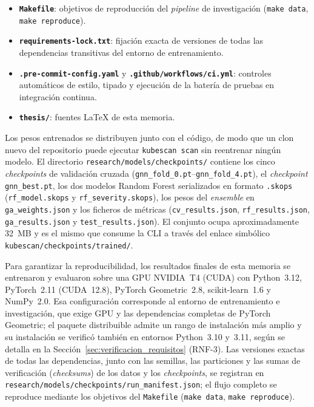 \begin{itemize}
  \item \textbf{\texttt{Makefile}}: objetivos de reproducción del \textit{pipeline}
    de investigación (\texttt{make data}, \texttt{make reproduce}).
  \item \textbf{\texttt{requirements-lock.txt}}: fijación exacta de versiones de
    todas las dependencias transitivas del entorno de entrenamiento.
  \item \textbf{\texttt{.pre-commit-config.yaml}} y
    \textbf{\texttt{.github/workflows/ci.yml}}: controles automáticos de estilo,
    tipado y ejecución de la batería de pruebas en integración continua.
  \item \textbf{\texttt{thesis/}}: fuentes LaTeX de esta memoria.
\end{itemize}

Los pesos entrenados se distribuyen junto con el código, de modo que un clon
nuevo del repositorio puede ejecutar \texttt{kubescan scan} sin reentrenar
ningún modelo. El directorio \texttt{research/models/checkpoints/} contiene los
cinco \textit{checkpoints} de validación cruzada
(\texttt{gnn\_fold\_0.pt}--\texttt{gnn\_fold\_4.pt}), el \textit{checkpoint}
\texttt{gnn\_best.pt}, los dos modelos Random Forest serializados en formato
\texttt{.skops} (\texttt{rf\_model.skops} y \texttt{rf\_severity.skops}), los
pesos del \textit{ensemble} en \texttt{ga\_weights.json} y los ficheros de
métricas (\texttt{cv\_results.json}, \texttt{rf\_results.json},
\texttt{ga\_results.json} y \texttt{test\_results.json}). El conjunto ocupa
aproximadamente 32~MB y es el mismo que consume la \ac{CLI} a través del enlace
simbólico \texttt{kubescan/checkpoints/trained/}.

Para garantizar la reproducibilidad, los resultados finales de esta memoria se
entrenaron y evaluaron sobre una GPU NVIDIA~T4 (CUDA) con Python~3.12, PyTorch~2.11
(CUDA~12.8), PyTorch Geometric~2.8, scikit-learn~1.6 y NumPy~2.0. Esa
configuración corresponde al entorno de entrenamiento e investigación, que exige
GPU y las dependencias completas de PyTorch Geometric; el paquete
distribuible admite un rango de instalación más amplio y su instalación se
verificó también en entornos Python~3.10 y~3.11, según se detalla en la
Sección~\ref{sec:verificacion_requisitos} (RNF-3). Las versiones
exactas de todas las dependencias, junto con las semillas, las particiones y las sumas
de verificación (\textit{checksums}) de los datos y los \textit{checkpoints}, se
registran en \texttt{research/models/checkpoints/run\_manifest.json}; el flujo completo
se reproduce mediante los objetivos del \texttt{Makefile} (\texttt{make data},
\texttt{make reproduce}).

